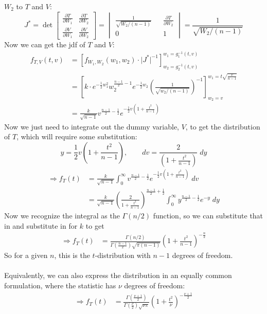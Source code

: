 \documentclass[a4paper,12pt]{scrartcl}
\begin{document}
$W_2$ to $T$ and $V$:
\[ J^* = \det \begin{bmatrix} \frac{\partial T}{\partial W_1} &
   \frac{\partial T}{\partial W_2} \\
   \frac{\partial V}{\partial W_1} &
   \frac{\partial V}{\partial W_2} \end{bmatrix} = 
   \begin{vmatrix} \frac{1}{\sqrt{W_2/(n-1)}} && \frac{\partial T}{
      \partial W_2} \\ 0 && 1 
   \end{vmatrix} = \frac{1}{\sqrt{W_2/(n-1)}}
   \]
Now we can get the jdf of $T$ and $V$:
\begin{align*}
   f_{T,V}(t,v) &= \left[ f_{W_1,W_2}(w_1, w_2) \cdot
      \lvert J^* \rvert^{-1}
      \right]^{w_1 = g_1^{-1}(t,v)}_{w_2 = g_2^{-1}(t,v)}\\
   &= \left[ k \cdot e^{-\frac{1}{2} w_1^2} 
      w_2^{\frac{n-1}{2} - 1} e^{-\frac{1}{2} w_2}  \left(
      \frac{1}{\sqrt{w_2/(n-1)}}\right)^{-1}
      \right]^{w_1 = t \sqrt{\frac{v}{
      n-1}}}_{w_2=v}\\
      &= \frac{k}{\sqrt{n-1}} v^{\frac{n-1}{2} - \frac{1}{2}}
      e^{-\frac{1}{2} v\left( 1 + \frac{t^2}{n-1}\right)} 
\end{align*}
Now we just need to integrate out the dummy variable, $V$, to 
get the distribution of $T$, which will require some substitution:
\[ y = \frac{1}{2} v \left( 1 + \frac{t^2}{n-1} \right), \qquad
   dv = \frac{2}{\left( 1 + \frac{t^2}{n-1} \right)} \; dy \]
\begin{align*}
   \Rightarrow f_{T}(t) &=\frac{k}{\sqrt{n-1}} \int^\infty_0
      v^{\frac{n-1}{2} - \frac{1}{2}}
      e^{-\frac{1}{2} v\left( 1 + \frac{t^2}{n-1}\right)} \; dv \\
      &= \frac{k}{\sqrt{n-1}} \left( \frac{2}{ 1 + \frac{t^2}{n-1} } 
      \right)^{\frac{n-1}{2} + \frac{1}{2}} \int^\infty_0 
      y^{\frac{n-1}{2} - \frac{1}{2}} e^{-y} \; dy
\end{align*}
Now we recognize the integral as the $\Gamma(n/2)$ function, so 
we can substitute that in and substitute in for $k$ to get
\begin{align*}
   \Rightarrow f_{T}(t) &=\frac{\Gamma(n/2)}{   
      \Gamma\left(\frac{n-1}{2}\right)\sqrt{\pi(n-1)}} 
      \left( 1 + \frac{t^2}{n-1}\right)^{-\frac{n}{2}}
\end{align*}
So for a given $n$, this is the $t$-distribution with $n-1$ degrees
of freedom. 
\\
\\
Equivalently, we can also express the distribution in an equally
common formulation, where the statistic has $\nu$ degrees of freedom:
\begin{align*}
   \Rightarrow f_{T}(t) &=\frac{\Gamma\left(\frac{\nu+1}{2}\right)}{   
      \Gamma\left(\frac{\nu}{2}\right)\sqrt{\nu\pi}} 
      \left( 1 + \frac{t^2}{\nu}\right)^{-\frac{\nu+1}{2}}
\end{align*}
\end{document}
